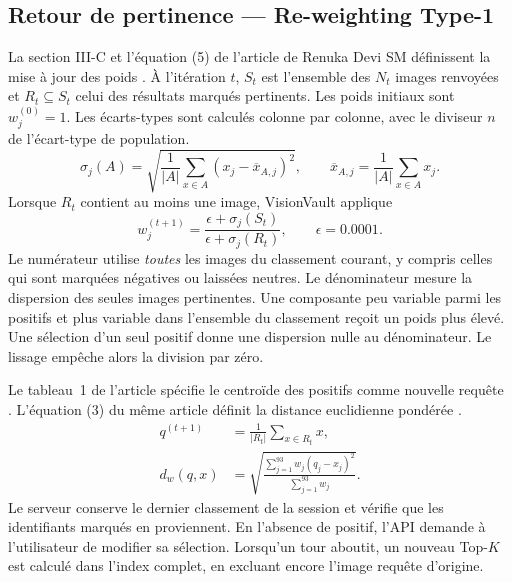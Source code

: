 \clearpage
\subsection{Retour de pertinence — Re-weighting Type-1}
\label{sec:type1}
La section III-C et l'équation (5) de l'article de Renuka Devi SM définissent la mise à jour des poids \cite[p.~551]{renuka2016}. À l'itération \(t\), \(S_t\) est l'ensemble des \(N_t\) images renvoyées et \(R_t\subseteq S_t\) celui des résultats marqués pertinents. Les poids initiaux sont \(w^{(0)}_j=1\). Les écarts-types sont calculés colonne par colonne, avec le diviseur \(n\) de l'écart-type de population.
\begin{equation}
  \sigma_j(A)=\sqrt{\frac1{|A|}\sum_{x\in A}(x_j-\overline{x}_{A,j})^2},
  \qquad
  \overline{x}_{A,j}=\frac1{|A|}\sum_{x\in A}x_j.
  \label{eq:dispersion}
\end{equation}
Lorsque \(R_t\) contient au moins une image, VisionVault applique
\begin{equation}
  w^{(t+1)}_j
    =\frac{\epsilon+\sigma_j(S_t)}{\epsilon+\sigma_j(R_t)},
  \qquad \epsilon=\num{0.0001}.
  \label{eq:type1}
\end{equation}
Le numérateur utilise \emph{toutes} les images du classement courant, y compris celles qui sont marquées négatives ou laissées neutres. Le dénominateur mesure la dispersion des seules images pertinentes. Une composante peu variable parmi les positifs et plus variable dans l'ensemble du classement reçoit un poids plus élevé. Une sélection d'un seul positif donne une dispersion nulle au dénominateur. Le lissage empêche alors la division par zéro.

Le tableau~1 de l'article spécifie le centroïde des positifs comme nouvelle requête \cite[p.~554]{renuka2016}. L'équation (3) du même article définit la distance euclidienne pondérée \cite[p.~551]{renuka2016}.
\begin{align}
  q^{(t+1)} &= \frac1{|R_t|}\sum_{x\in R_t}x ,
    \label{eq:centroide}\\
  d_w(q,x) &= \sqrt{\frac{\sum_{j=1}^{93} w_j(q_j-x_j)^2}
                             {\sum_{j=1}^{93}w_j}} .
    \label{eq:distance-ponderee}
\end{align}
Le serveur conserve le dernier classement de la session et vérifie que les identifiants marqués en proviennent. En l'absence de positif, l'API demande à l'utilisateur de modifier sa sélection. Lorsqu'un tour aboutit, un nouveau Top-\(K\) est calculé dans l'index complet, en excluant encore l'image requête d'origine.


